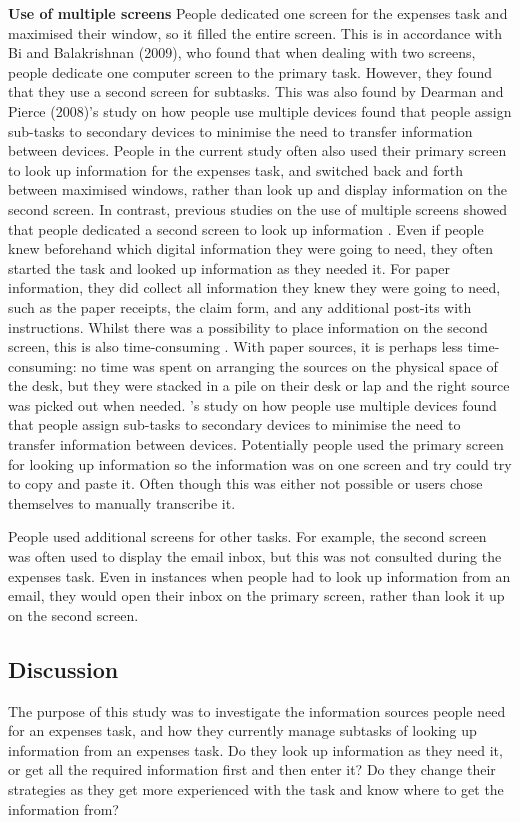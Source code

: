 \textbf{Use of multiple screens}
People dedicated one screen for the expenses task and maximised their window, so it filled the entire screen. This is in accordance with Bi and Balakrishnan (2009), who found that when dealing with two screens, people dedicate one computer screen to the primary task. However, they found that they use a second screen for subtasks. This was also found by Dearman and Pierce (2008)'s study on how people use multiple devices found that people assign sub-tasks to secondary devices to minimise the need to transfer information between devices.
People in the current study often also used their primary screen to look up information for the expenses task, and switched back and forth between maximised windows, rather than look up and display information on the second screen. In contrast, previous studies on the use of multiple screens showed that people dedicated a second screen to look up information \citep{Bi2009, Gurdin2001}. Even if people knew beforehand which digital information they were going to need, they often started the task and looked up information as they needed it. For paper information, they did collect all information they knew they were going to need, such as the paper receipts, the claim form, and any additional post-its with instructions. 
Whilst there was a possibility to place information on the second screen, this is also time-consuming \citep{Bardram2006}. With paper sources, it is perhaps less time-consuming: no time was spent on arranging the sources on the physical space of the desk, but they were stacked in a pile on their desk or lap and the right source was picked out when needed.
\citet{Dearman2008}'s study on how people use multiple devices found that people assign sub-tasks to secondary devices to minimise the need to transfer information between devices. Potentially people used the primary screen for looking up information so the information was on one screen and try could try to copy and paste it. Often though this was either not possible or users chose themselves to manually transcribe it.
 
People used additional screens for other tasks. For example, the second screen was often used to display the email inbox, but this was not consulted during the expenses task. Even in instances when people had to look up information from an email, they would open their inbox on the primary screen, rather than look it up on the second screen. 


\subsection{Discussion}
The purpose of this study was to investigate the information sources people need for an expenses task, and how they currently manage subtasks of looking up information from an expenses task.  Do they look up information as they need it, or get all the required information first and then enter it? Do they change their strategies as they get more experienced with the task and know where to get the information from?

